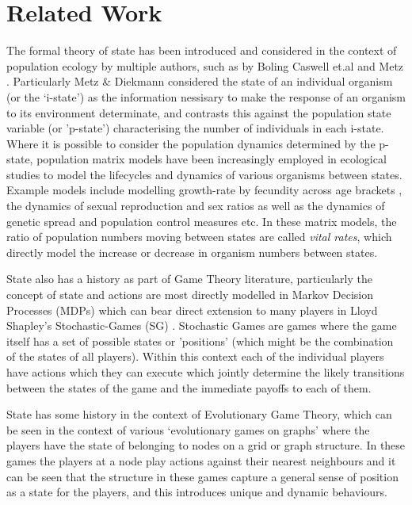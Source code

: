 \section{Related Work}\label{sec:-1}

The formal theory of state has been introduced and considered in the context of population ecology by multiple authors, 
such as by Boling \cite{BOLING1973485} Caswell et.al \cite{nla.cat-vn662318} and Metz \cite{Metz1977}. Particularly Metz \& Diekmann\cite{nla.cat-vn2330051} considered the state of an individual organism (or the `i-state') as the information nessisary to make the response of an organism to its environment determinate, and contrasts this against the population state variable (or 'p-state') characterising the number of individuals in each i-state. 
Where it is possible to consider the population dynamics determined by the p-state, population matrix models have been increasingly employed in ecological studies to model the lifecycles and dynamics of various organisms between states.\cite{doi:10.1111/j.1461-0248.2010.01540.x}
Example models include modelling growth-rate by fecundity across age brackets \cite{leslie}, the dynamics of sexual reproduction and sex ratios \cite{Shyu2018,doi:10.1111/1365-2664.12177} as well as the dynamics of genetic spread and population control measures \cite{DEVRIES2020108875} etc.
In these matrix models, the ratio of population numbers moving between states are called \textit{vital rates}, which directly model the increase or decrease in organism numbers between states.

State also has a history as part of Game Theory literature, particularly the concept of state and actions are most directly modelled in Markov Decision Processes (MDPs) which can bear direct extension to many players in Lloyd Shapley's Stochastic-Games (SG) \cite{shapley53,Solan2015}. Stochastic Games are games where the game itself has a set of possible states or 'positions' (which might be the combination of the states of all players). Within this context each of the individual players have actions which they can execute which jointly determine the likely transitions between the states of the game and the immediate payoffs to each of them.

State has some history in the context of Evolutionary Game Theory, which can be seen in the context of various `evolutionary games on graphs' where the players have the state of belonging to nodes on a grid or graph structure. In these games the players at a node play actions against their nearest neighbours and it can be seen that the structure in these games capture a general sense of position as a state for the players, and this introduces unique and dynamic behaviours.\cite{nowak,spacial2,spacial4}

